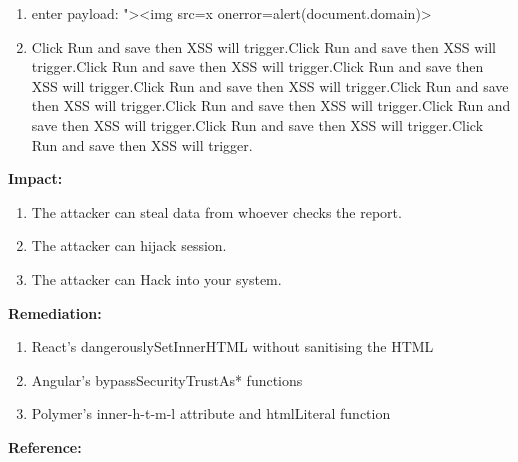 \documentclass{article}
\begin{document}
\begin{description}[itemsep=2pt, leftmargin=0.2cm]
\begin{enumerate}[leftmargin=0.5cm]
                        \item \large enter payload: "><img src=x onerror=alert(document.domain)>

                        \item \large Click Run and save then XSS will trigger.Click Run and save then XSS will trigger.Click Run and save then XSS will trigger.Click Run and save then XSS will trigger.Click Run and save then XSS will trigger.Click Run and save then XSS will trigger.Click Run and save then XSS will trigger.Click Run and save then XSS will trigger.Click Run and save then XSS will trigger.Click Run and save then XSS will trigger.
                        \end{enumerate}
                        
                        \item \large \textbf{Impact:}
                        \linespread{1.0}
                        \begin{enumerate}[leftmargin=0.5cm]
                        \item \large The attacker can steal data from whoever checks the report.
\item \large The attacker can hijack session.
\item \large The attacker can Hack into your system. 
                        \end{enumerate}  
                
                
                        \item \large \textbf{Remediation:}
                        \linespread{1.0}
                        \begin{enumerate}[leftmargin=0.5cm]
                            
                        \item \large React’s dangerouslySetInnerHTML without sanitising the HTML

                        \item \large Angular’s bypassSecurityTrustAs* functions

                        \item \large Polymer's inner-h-t-m-l attribute and htmlLiteral function
                        \end{enumerate}

                        \item \large \textbf{Reference:}
                        \linespread{1.0}
                        \begin{enumerate}[leftmargin=0.5cm, ]
                            

\end{enumerate}
\end{description}
\end{document}
